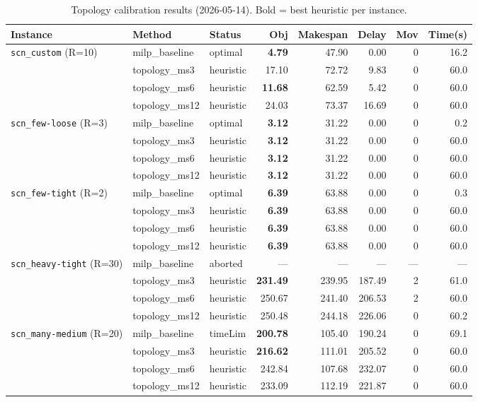 \begin{table}[h]
\centering
\caption{Topology calibration results (2026-05-14).  Bold = best heuristic per instance.}
\label{tab:exp01a}
\begin{tabular}{lllrrrrr}
\toprule
Instance & Method & Status & Obj & Makespan & Delay & Mov & Time(s) \\
\midrule
\multirow{4}{*}{\texttt{scn\_custom} (R=10)}
 & milp\_baseline & optimal   &  \textbf{4.79} &  47.90 &  0.00 & 0 & 16.2 \\
 & topology\_ms3  & heuristic & 17.10          &  72.72 &  9.83 & 0 & 60.0 \\
 & topology\_ms6  & heuristic & \textbf{11.68} &  62.59 &  5.42 & 0 & 60.0 \\
 & topology\_ms12 & heuristic & 24.03          &  73.37 & 16.69 & 0 & 60.0 \\
\midrule
\multirow{4}{*}{\texttt{scn\_few-loose} (R=3)}
 & milp\_baseline & optimal   & \textbf{3.12}  &  31.22 &  0.00 & 0 &  0.2 \\
 & topology\_ms3  & heuristic & \textbf{3.12}  &  31.22 &  0.00 & 0 & 60.0 \\
 & topology\_ms6  & heuristic & \textbf{3.12}  &  31.22 &  0.00 & 0 & 60.0 \\
 & topology\_ms12 & heuristic & \textbf{3.12}  &  31.22 &  0.00 & 0 & 60.0 \\
\midrule
\multirow{4}{*}{\texttt{scn\_few-tight} (R=2)}
 & milp\_baseline & optimal   & \textbf{6.39}  &  63.88 &  0.00 & 0 &  0.3 \\
 & topology\_ms3  & heuristic & \textbf{6.39}  &  63.88 &  0.00 & 0 & 60.0 \\
 & topology\_ms6  & heuristic & \textbf{6.39}  &  63.88 &  0.00 & 0 & 60.0 \\
 & topology\_ms12 & heuristic & \textbf{6.39}  &  63.88 &  0.00 & 0 & 60.0 \\
\midrule
\multirow{4}{*}{\texttt{scn\_heavy-tight} (R=30)}
 & milp\_baseline & aborted   &     —          &      — &     — & — &    — \\
 & topology\_ms3  & heuristic & \textbf{231.49} & 239.95 & 187.49 & 2 & 61.0 \\
 & topology\_ms6  & heuristic & 250.67          & 241.40 & 206.53 & 2 & 60.0 \\
 & topology\_ms12 & heuristic & 250.48          & 244.18 & 226.06 & 0 & 60.2 \\
\midrule
\multirow{4}{*}{\texttt{scn\_many-medium} (R=20)}
 & milp\_baseline & timeLim   & \textbf{200.78} & 105.40 & 190.24 & 0 & 69.1 \\
 & topology\_ms3  & heuristic & \textbf{216.62} & 111.01 & 205.52 & 0 & 60.0 \\
 & topology\_ms6  & heuristic & 242.84          & 107.68 & 232.07 & 0 & 60.0 \\
 & topology\_ms12 & heuristic & 233.09          & 112.19 & 221.87 & 0 & 60.0 \\
\bottomrule
\end{tabular}
\end{table}

